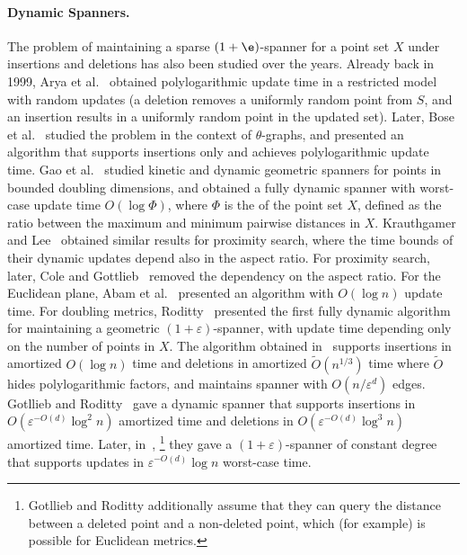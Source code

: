 \documentclass[11pt]{article}
\newcommand{\ddim}{\ensuremath{d}}
\begin{document}
\paragraph{Dynamic Spanners.} The problem of maintaining a sparse $(1+\e)$-spanner for a point set $X$ under insertions and deletions has also been studied over the years. Already back in 1999, Arya et al.~\cite{arya1999dynamic} obtained polylogarithmic update time in a restricted model with random updates
(a deletion removes a uniformly random point from $S$, and an insertion results in a uniformly random point in the updated set).
Later, Bose et al.~\cite{bose2004ordered} studied the problem in the context of $\theta$-graphs, and presented an algorithm that supports insertions only and achieves polylogarithmic update time. 
Gao et al.~\cite{gao2004deformable} studied kinetic and dynamic geometric spanners for points in bounded doubling dimensions, and obtained a fully dynamic spanner 
with worst-case update time $O(\log \Phi)$, where $\Phi$ is the 
 of the point set $X$, defined as the ratio between the maximum and minimum pairwise distances in $X$. Krauthgamer and Lee~\cite{KL04} obtained similar results for proximity search, where the time bounds of their dynamic updates depend also in the aspect ratio. For proximity search, later, Cole and Gottlieb~\cite{cole2006searching} removed the dependency on the aspect ratio. For the Euclidean plane, Abam et al.~\cite{abam2008simple} presented an algorithm with $O(\log n)$ update time. 
For doubling metrics, Roditty~\cite{roditty2012fully} presented the first fully dynamic algorithm for maintaining a geometric $(1+\varepsilon)$-spanner, with update time depending only on the number of points in $X$. The algorithm obtained in~\cite{roditty2012fully} supports insertions in amortized $O(\log n)$ time and deletions in amortized $\tilde{O}(n^{1/3})$ time
where $\tilde{O}$ hides polylogarithmic factors, 
and maintains spanner with $O(n / \varepsilon^{\ddim})$ edges.
Gotllieb and Roditty~\cite{GottliebR08}
gave a dynamic spanner that supports insertions in \(O\!\left(\varepsilon^{-O(\ddim)} \log^{2} n\right)\) amortized time and deletions in \(O\!\left(\varepsilon^{-O(\ddim)} \log^{3} n\right)\) amortized time.
Later, in~\cite{gottlieb2008optimal},
\footnote{Gotllieb and Roditty \cite{gottlieb2008optimal} additionally assume that they can query the distance between a deleted point and a non-deleted point, which (for example) is possible for Euclidean metrics.}
they gave a \((1+\varepsilon)\)-spanner of constant degree that supports updates in $\varepsilon^{-O(\ddim)} \log n$ worst-case time.
\end{document}

